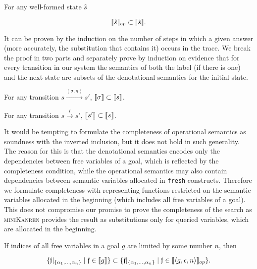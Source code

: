 \begin{lemma}
\label{lem:gen_soundness}
For any well-formed state $\hat{s}$

\[
\llbracket{\hat{s}}\rrbracket_{op} \subset \llbracket{\hat{s}}\rrbracket.
\]
\end{lemma}

It can be proven by the induction on the number of steps in which a given answer (more accurately, the substitution that contains it) occurs in the trace.
We break the proof in two parts and separately prove by induction on evidence that for every transition in our system the semantics of both the label (if there is one)
and the next state are subsets of the denotational semantics for the initial state.

\begin{lemma}
\label{lem:answer_soundness}
For any transition $s \xrightarrow{(\sigma, n)} s'$,
$\llbracket{\sigma}\rrbracket \subset \llbracket{s}\rrbracket$.
\end{lemma}

\begin{lemma}
\label{lem:next_state_soundness}
For any transition $s \xrightarrow{l} s'$,
$\llbracket{s'}\rrbracket \subset \llbracket{s}\rrbracket$.
\end{lemma}

It would be tempting to formulate the completeness of operational semantics as soundness with the inverted inclusion, but it does not hold in such generality.
The reason for this is that the denotational semantics encodes only the dependencies between free variables of a goal, which is reflected by the completeness condition,
while the operational semantics may also contain dependencies between semantic variables allocated in \lstinline|fresh| constructs. Therefore we formulate completeness
with representing functions restricted on the semantic variables allocated in the beginning (which includes all free variables of a goal). This does not
compromise our promise to prove the completeness of the search as \textsc{miniKanren} provides the result as substitutions only for queried variables,
which are allocated in the beginning.

\begin{theorem}
\label{lem:gen_completeness}
If indices of all free variables in a goal $g$ are limited by some number $n$, then

\[
\{\mathfrak{f}|_{\{\alpha_1,\dots,\alpha_n\}} \mid \mathfrak{f} \in \llbracket{g}\rrbracket\} \subset \{\mathfrak{f}|_{\{\alpha_1,\dots,\alpha_n\}} \mid \mathfrak{f} \in \llbracket{\left<{g, \epsilon, n}\right>}\rrbracket_{op}\}.
\]
\end{theorem}

